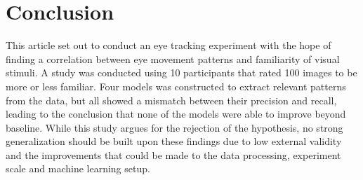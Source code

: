 \documentclass{llncs}
\begin{document}
\section{Conclusion}
This article set out to conduct an eye tracking experiment with the hope of finding a correlation between
eye movement patterns and familiarity of visual stimuli. A study was conducted using 10 participants that
rated 100 images to be more or less familiar. Four models was constructed to extract relevant patterns
from the data, but all showed a mismatch between their precision and recall, leading to the conclusion that
none of the models were able to improve beyond baseline. While this study argues for the rejection of the
hypothesis, no strong generalization should be built upon these findings due to low external validity and
the improvements that could be made to the data processing, experiment scale and machine learning setup.

\clearpage
\end{document}
